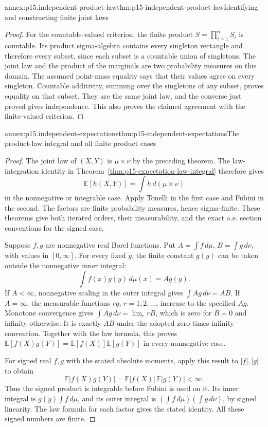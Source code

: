 \begin{annexitem}{annex:p15.independent-product-law}{thm:p15-independent-product-law}{Identifying and constructing finite joint laws}
\begin{proof}
For the countable-valued criterion, the finite product
\(S=\prod_{i=1}^n S_i\) is countable. Its product sigma-algebra
contains every singleton rectangle and therefore every subset, since
each subset is a countable union of singletons. The joint law and
the product of the marginals are two probability measures on this
domain. The assumed point-mass equality says that their values agree
on every singleton. Countable additivity, summing over the singletons
of any subset, proves equality on that subset. They are the same
joint law, and the converse just proved gives independence. This
also proves the claimed agreement with the finite-valued criterion.
\end{proof}
\end{annexitem}

\begin{annexitem}{annex:p15.independent-expectations}{thm:p15-independent-expectations}{The product-law integral and all finite product cases}
\begin{proof}
The joint law of \((X,Y)\) is \(\mu\times\nu\) by the
preceding theorem. The law-integration identity in
Theorem~\ref{thm:p15-expectation-law-integral} therefore gives
\[
 \mathbb E[h(X,Y)]=\int h\,d(\mu\times\nu)
\]
in the nonnegative or integrable case. Apply Tonelli in the first
case and Fubini in the second. The factors are finite probability
measures, hence sigma-finite. These theorems give both iterated
orders, their measurability, and the exact a.e. section conventions
for the signed case.

Suppose \(f,g\) are nonnegative real Borel functions. Put
\(A=\int f\,d\mu\), \(B=\int g\,d\nu\), with values in
\([0,\infty]\). For every fixed \(y\), the finite constant
\(g(y)\) can be taken outside the nonnegative inner integral:
\[
 \int f(x)g(y)\,d\mu(x)=A g(y).
\]
If \(A<\infty\), nonnegative scaling in the outer integral gives
\(\int A g\,d\nu=AB\). If \(A=\infty\), the measurable
functions \(r g\), \(r=1,2,\ldots\), increase to the
specified \(A g\). Monotone convergence gives
\(\int A g\,d\nu=\lim_r rB\), which is zero for \(B=0\)
and infinity otherwise. It is exactly \(AB\) under the adopted
zero-times-infinity convention. Together with the law formula,
this proves \(\mathbb E[f(X)g(Y)]=\mathbb E[f(X)]\mathbb E[g(Y)]\)
in every nonnegative case.

For signed real \(f,g\) with the stated absolute moments, apply
this result to \(|f|,|g|\) to obtain
\[
 \mathbb E|f(X)g(Y)|=
             \mathbb E|f(X)|\,\mathbb E|g(Y)|<\infty.
\]
Thus the signed product is integrable before Fubini is used on it.
Its inner integral is \(g(y)\int f\,d\mu\), and its outer
integral is \((\int f\,d\mu)(\int g\,d\nu)\), by signed
linearity. The law formula for each factor gives the stated identity.
All these signed numbers are finite.


\end{proof}
\end{annexitem}
